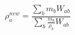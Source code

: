 \documentclass[12pt]{article}
\begin{document}
$$
   \rho_a^{new} = \frac{\sum_b m_b W_{ab}}{\sum_b \frac{m_b}{\rho_b} W_{ab}}   
$$
\end{document}
